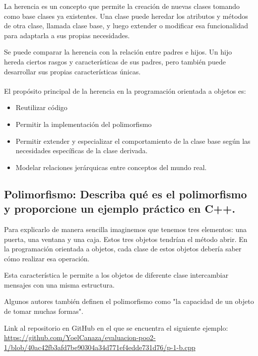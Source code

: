 \documentclass[11pt,a4paper]{article}
\begin{document}
La herencia es un concepto que permite la creación de nuevas clases tomando como base clases ya existentes. Una clase puede heredar los atributos y métodos de otra clase, llamada clase base, y luego extender o modificar esa funcionalidad para adaptarla a sus propias necesidades.

Se puede comparar la herencia con la relación entre padres e hijos. Un hijo hereda ciertos rasgos y características de sus padres, pero también puede desarrollar sus propias características únicas.
\\ \\
El propósito principal de la herencia en la programación orientada a objetos es:

\begin{itemize}
\item Reutilizar código
\item Permitir la implementación del polimorfismo
\item Permitir extender y especializar el comportamiento de la clase base según las necesidades específicas de la clase derivada.
\item Modelar relaciones jerárquicas entre conceptos del mundo real. 
\end{itemize}


\subsection{Polimorfismo: Describa qué es el polimorfismo y proporcione un ejemplo práctico en C++.}
Para explicarlo de manera sencilla imaginemos que tenemos tres elementos: una puerta, una ventana y una caja. Estos tres objetos tendrían el método abrir. En la programación orientada a objetos, cada clase de estos objetos debería saber cómo realizar esa operación.

Esta característica le permite a los objetos de diferente clase intercambiar mensajes con una misma estructura.

Algunos autores también definen el polimorfismo como "la capacidad de un objeto de tomar muchas formas".

Link al repositorio en GitHub en el que se encuentra el siguiente ejemplo: \url{https://github.com/YoelCanaza/evaluacion-poo2-1/blob/40ac42fb3afd7be90304a34d771ef4edde731d76/p-1-b.cpp}
\end{document}
